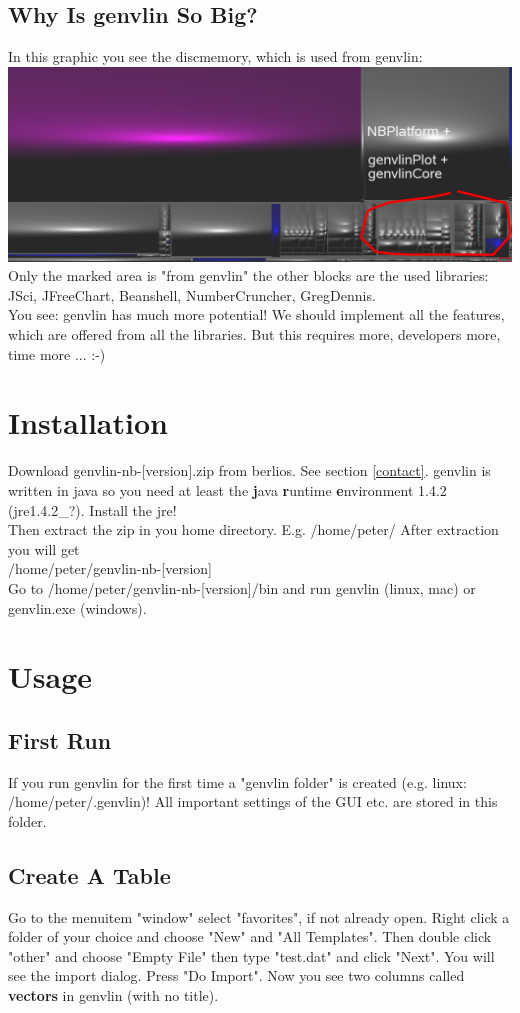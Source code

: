 \documentclass[12pt]{article}
\begin{document}
\subsection{Why Is genvlin So Big?}
In this graphic you see the discmemory, which is used from genvlin:\\
\includegraphics[width=\textwidth]{WhyIsGenvlinSoBig.png}
Only the marked area is "from genvlin" the other blocks are the used libraries:\\
JSci, JFreeChart, Beanshell, NumberCruncher, GregDennis.\\
You see: genvlin has much more potential! We should implement all the features, which are offered from all the libraries. But this requires more, developers more, time more ... :-) 
\section{Installation}
Download genvlin-nb-[version].zip from berlios. See section \ref{contact}. genvlin is written in java so you need at least the {\bf j}ava {\bf r}untime {\bf e}nvironment 1.4.2 (jre1.4.2\_?). Install the jre!\\
Then extract the zip in you home directory. E.g. /home/peter/ After extraction you will get\\ /home/peter/genvlin-nb-[version]\\ Go to /home/peter/genvlin-nb-[version]/bin and run genvlin (linux, mac) or genvlin.exe (windows).
\section{Usage}
\subsection{First Run}
If you run genvlin for the first time a "genvlin folder" is created (e.g. linux: /home/peter/.genvlin)!
All important settings of the GUI etc. are stored in this folder.\\
\subsection{Create A Table}
Go to the menuitem "window" select "favorites", if not already open. Right click a folder of your choice and choose
"New" and "All Templates". Then double click "other" and choose "Empty File" then type "test.dat" and click "Next".
You will see the import dialog. Press "Do Import". Now you see two columns called {\bf vectors} in genvlin (with no title).
\end{document}
